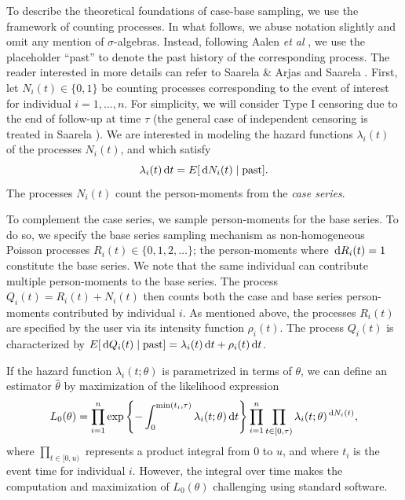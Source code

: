 To describe the theoretical foundations of case-base sampling, we use
the framework of counting processes. In what follows, we abuse notation
slightly and omit any mention of \(\sigma\)-algebras. Instead, following
Aalen \textit{et al} \citeyearpar{aalen2008survival}, we use the
placeholder ``past'' to denote the past history of the corresponding
process. The reader interested in more details can refer to Saarela \&
Arjas \citeyearpar{saarela2015non} and Saarela
\citeyearpar{saarela2016case}. First, let \(N_{i}(t) \in \{0, 1\}\) be
counting processes corresponding to the event of interest for individual
\(i=1, \ldots,n\). For simplicity, we will consider Type I censoring due
to the end of follow-up at time \(\tau\) (the general case of
independent censoring is treated in Saarela
\citeyearpar{saarela2016case}). We are interested in modeling the hazard
functions \(\lambda_{i}(t)\) of the processes \(N_i(t)\), and which
satisfy
\[\lambda_{i}(t)\,\textrm dt = E[\,\textrm dN_{i}(t)\mid \mathrm{past}].\]
The processes \(N_i(t)\) count the person-moments from the \emph{case
series}.

To complement the case series, we sample person-moments for the base
series. To do so, we specify the base series sampling mechanism as
non-homogeneous Poisson processes \(R_i(t) \in \{0, 1, 2, \ldots\}\);
the person-moments where \(\,\textrm dR_i(t) = 1\) constitute the base
series. We note that the same individual can contribute multiple
person-moments to the base series. The process
\(Q_{i}(t) = R_i(t) + N_{i}(t)\) then counts both the case and base
series person-moments contributed by individual \(i\). As mentioned
above, the processes \(R_i(t)\) are specified by the user via its
intensity function \(\rho_i(t)\). The process \(Q_{i}(t)\) is
characterized by
\(E[\,\textrm dQ_{i}(t)\mid\mathrm{past}] = \lambda_{i}(t)\,\textrm dt + \rho_i(t)\,\textrm dt\).

If the hazard function \(\lambda_{i}(t; \theta)\) is parametrized in
terms of \(\theta\), we can define an estimator \(\hat{\theta}\) by
maximization of the likelihood expression
\[L_0(\theta) = \prod_{i=1}^n \exp\left\{ -\int_0^{\min(t_i,\tau)} \lambda_i(t; \theta)\,\textrm dt \right\} \prod_{i=1}^{n} \prod_{t\in[0,\tau)} \lambda_{i}(t;\theta)^{\,\textrm dN_{i}(t)},\]
where \(\prod_{t\in[0,u)}\) represents a product integral from \(0\) to
\(u\), and where \(t_i\) is the event time for individual \(i\).
However, the integral over time makes the computation and maximization
of \(L_0(\theta)\) challenging using standard software.

